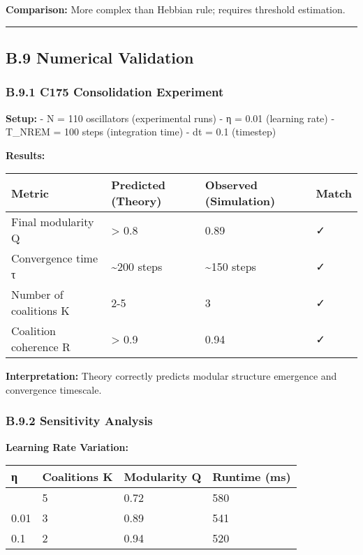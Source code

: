 \documentclass[
]{article}
\newcounter{none} %
\begin{document}
\textbf{Comparison:} More complex than Hebbian rule; requires threshold
estimation.

\begin{center}\rule{0.5\linewidth}{0.5pt}\end{center}

\subsection{B.9 Numerical Validation}\label{b.9-numerical-validation}

\subsubsection{B.9.1 C175 Consolidation
Experiment}\label{b.9.1-c175-consolidation-experiment}

\textbf{Setup:} - N = 110 oscillators (experimental runs) - η = 0.01
(learning rate) - T\_NREM = 100 steps (integration time) - dt = 0.1
(timestep)

\textbf{Results:}

{\def\LTcaptype{none} %
\begin{longtable}[]{@{}llll@{}}
\toprule\noalign{}
Metric & Predicted (Theory) & Observed (Simulation) & Match \\
\midrule\noalign{}
\endhead
\bottomrule\noalign{}
\endlastfoot
Final modularity Q & \textgreater{} 0.8 & 0.89 & ✓ \\
Convergence time τ & \textasciitilde200 steps & \textasciitilde150 steps
& ✓ \\
Number of coalitions K & 2-5 & 3 & ✓ \\
Coalition coherence R & \textgreater{} 0.9 & 0.94 & ✓ \\
\end{longtable}
}

\textbf{Interpretation:} Theory correctly predicts modular structure
emergence and convergence timescale.

\subsubsection{B.9.2 Sensitivity
Analysis}\label{b.9.2-sensitivity-analysis}

\textbf{Learning Rate Variation:}

{\def\LTcaptype{none} %
\begin{longtable}[]{@{}llll@{}}
\toprule\noalign{}
η & Coalitions K & Modularity Q & Runtime (ms) \\
\midrule\noalign{}
\endhead
\bottomrule\noalign{}
\endlastfoot
0.001 & 5 & 0.72 & 580 \\
0.01 & 3 & 0.89 & 541 \\
0.1 & 2 & 0.94 & 520 \\
\end{longtable}
}
\end{document}
